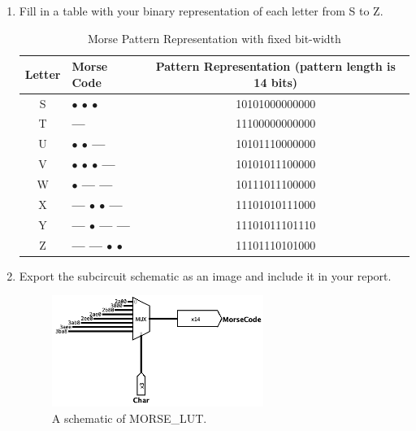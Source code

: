 \documentclass{article}
\begin{document}
\begin{enumerate}
\item Fill in a table with your binary representation of each letter from S to Z.

\begin{table}[ht!]
\centering
\begin{tabular}{|c|l|c|} \hline
    \textbf{Letter} & \textbf{Morse Code} & \textbf{Pattern Representation (pattern length is 14 bits)} \\ \hline

    S & \textbf{$\bullet$ $\bullet$ $\bullet$} & 10101000000000\\ \hline
    T & \textbf{---} & 11100000000000 \\ \hline
    U & \textbf{$\bullet$ $\bullet$ --- } & 10101110000000 \\ \hline
    V & \textbf{$\bullet$ $\bullet$ $\bullet$ --- } & 10101011100000\\ \hline
    W & \textbf{$\bullet$ --- ---} & 10111011100000\\ \hline
    X & \textbf{--- $\bullet$ $\bullet$ ---} & 11101010111000\\ \hline
    Y & \textbf{--- $\bullet$ --- ---} & 11101011101110\\ \hline
    Z & \textbf{--- --- $\bullet$ $\bullet$} & 11101110101000\\ \hline

\end{tabular}
\caption{Morse Pattern Representation with fixed bit-width}
\label{tab:morse:pattern}
\end{table}

\item Export the subcircuit schematic as an image and include it in your report.

\begin{figure}[ht!]
    \centering
    \includegraphics[width=0.65\textwidth]{lab5_morse_lut.png}
    \caption{A schematic of MORSE\_LUT.}
    \label{f:morse_lut}
\end{figure}
\end{enumerate}
\end{document}
